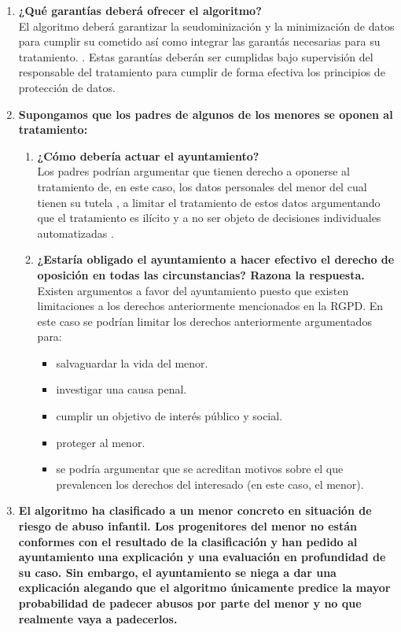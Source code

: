 \documentclass[10pt,a4paper]{article}
\begin{document}
\begin{enumerate}
\item \textbf{¿Qué garantías deberá ofrecer el algoritmo?}\\
El algoritmo deberá garantizar la seudominización y la minimización de datos para cumplir su cometido así como integrar las garantás necesarias para su tratamiento. \cite[art 21]{RGPD}. Estas garantías deberán ser cumplidas bajo supervisión del responsable del tratamiento para cumplir de forma efectiva los principios de protección de datos.
\item \textbf{Supongamos que los padres de algunos de los menores se oponen al tratamiento:}
\begin{enumerate}
\item \textbf{¿Cómo debería actuar el ayuntamiento?}\\
Los padres podrían argumentar que tienen derecho a oponerse al tratamiento de, en este caso, los datos personales del menor del cual tienen su tutela \cite[art 16]{RGPD}, a limitar el tratamiento de estos datos argumentando que el tratamiento es ilícito \cite[art 18]{RGPD} y a no ser objeto de decisiones individuales automatizadas \cite[art 22]{RGPD}.
\item \textbf{¿Estaría obligado el ayuntamiento a hacer efectivo el derecho de oposición en todas las circunstancias? Razona la respuesta.}\\
Existen argumentos a favor del ayuntamiento puesto que existen limitaciones a los derechos anteriormente mencionados en la RGPD. En este caso se podrían limitar los derechos anteriormente argumentados para:
\begin{itemize}
\item salvaguardar la vida del menor.
\item investigar una causa penal.
\item cumplir un objetivo de interés público y social.
\item proteger al menor.
\item se podría argumentar que se acreditan motivos sobre el que prevalencen los derechos del interesado (en este caso, el menor).
\end{itemize}

\end{enumerate}

\item \textbf{El algoritmo ha clasificado a un menor concreto en situación de riesgo de abuso infantil. Los progenitores del menor no están conformes con el resultado de la clasificación y han pedido al ayuntamiento una explicación y una evaluación en profundidad de su caso. Sin embargo, el ayuntamiento se niega a dar una explicación alegando que el algoritmo únicamente predice la mayor probabilidad de padecer abusos por parte del menor y no que realmente vaya a padecerlos.}
\begin{enumerate}
 

\end{enumerate}
\end{enumerate}
\end{document}
